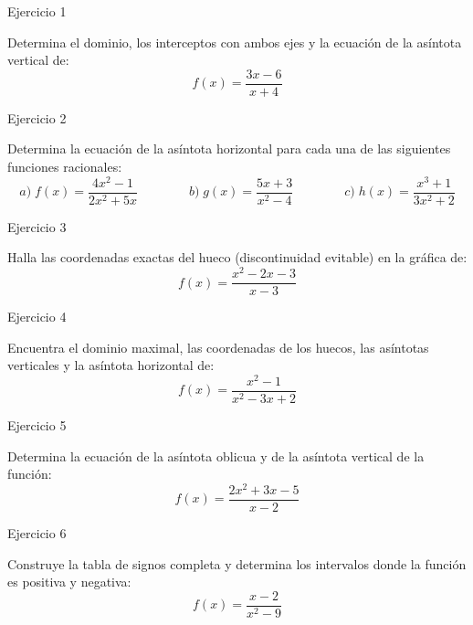 \documentclass[aspectratio=169]{beamer}
\begin{document}
\begin{frame}{Ejercicio 1}
  \begin{mwejercicio}
    Determina el dominio, los interceptos con ambos ejes y la ecuación de la asíntota vertical de:
    $$f(x) = \frac{3x - 6}{x + 4}$$
  \end{mwejercicio}
  \vspace{3.5cm}
\end{frame}
\begin{frame}{Ejercicio 2}
  \begin{mwejercicio}
    Determina la ecuación de la asíntota horizontal para cada una de las siguientes funciones racionales:
    $$a)\; f(x) = \frac{4x^2 - 1}{2x^2 + 5x} \qquad\qquad b)\; g(x) = \frac{5x + 3}{x^2 - 4} \qquad\qquad c)\; h(x) = \frac{x^3 + 1}{3x^2 + 2}$$
  \end{mwejercicio}
  \vspace{3.5cm}
\end{frame}
\begin{frame}{Ejercicio 3}
  \begin{mwejercicio}
    Halla las coordenadas exactas del hueco (discontinuidad evitable) en la gráfica de:
    $$f(x) = \frac{x^2 - 2x - 3}{x - 3}$$
  \end{mwejercicio}
  \vspace{3.5cm}
\end{frame}
\begin{frame}{Ejercicio 4}
  \begin{mwejercicio}
    Encuentra el dominio maximal, las coordenadas de los huecos, las asíntotas verticales y la asíntota horizontal de:
    $$f(x) = \frac{x^2 - 1}{x^2 - 3x + 2}$$
  \end{mwejercicio}
  \vspace{3.5cm}
\end{frame}
\begin{frame}{Ejercicio 5}
  \begin{mwejercicio}
    Determina la ecuación de la asíntota oblicua y de la asíntota vertical de la función:
    $$f(x) = \frac{2x^2 + 3x - 5}{x - 2}$$
  \end{mwejercicio}
  \vspace{3.5cm}
\end{frame}
\begin{frame}{Ejercicio 6}
  \begin{mwejercicio}
    Construye la tabla de signos completa y determina los intervalos donde la función es positiva y negativa:
    $$f(x) = \frac{x - 2}{x^2 - 9}$$
  \end{mwejercicio}
  \vspace{3.5cm}
\end{frame}
\end{document}
